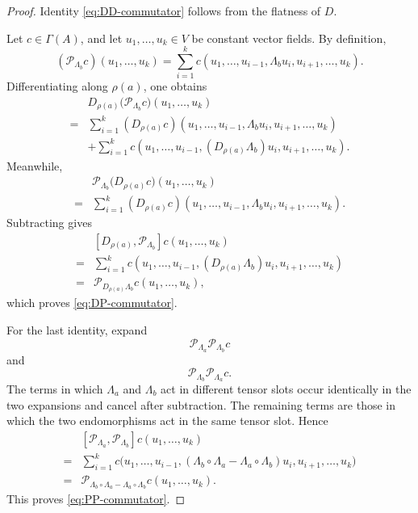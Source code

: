 \documentclass[12pt,reqno]{amsart}
\theoremstyle{definition}
\theoremstyle{remark}
\begin{document}
\begin{proof}
Identity \eqref{eq:DD-commutator} follows from the flatness of \(D\).

Let \(c\in\Gamma(A)\), and let
\(u_1,\ldots,u_k\in V\) be constant vector fields. By definition,
\[
(\mathcal P_{\Lambda_b}c)(u_1,\ldots,u_k)
=
\sum_{i=1}^k
c(u_1,\ldots,u_{i-1},
\Lambda_bu_i,
u_{i+1},\ldots,u_k).
\]
Differentiating along \(\rho(a)\), one obtains
\[
\begin{aligned}
&D_{\rho(a)}
\bigl(\mathcal P_{\Lambda_b}c\bigr)
(u_1,\ldots,u_k)
\\
={}&
\sum_{i=1}^k
(D_{\rho(a)}c)
(u_1,\ldots,u_{i-1},
\Lambda_bu_i,
u_{i+1},\ldots,u_k)
\\
&+
\sum_{i=1}^k
c(u_1,\ldots,u_{i-1},
(D_{\rho(a)}\Lambda_b)u_i,
u_{i+1},\ldots,u_k).
\end{aligned}
\]
Meanwhile,
\[
\begin{aligned}
&\mathcal P_{\Lambda_b}
\bigl(D_{\rho(a)}c\bigr)
(u_1,\ldots,u_k)
\\
={}&
\sum_{i=1}^k
(D_{\rho(a)}c)
(u_1,\ldots,u_{i-1},
\Lambda_bu_i,
u_{i+1},\ldots,u_k).
\end{aligned}
\]
Subtracting gives
\[
\begin{aligned}
&[D_{\rho(a)},\mathcal P_{\Lambda_b}]c
(u_1,\ldots,u_k)
\\
={}&
\sum_{i=1}^k
c(u_1,\ldots,u_{i-1},
(D_{\rho(a)}\Lambda_b)u_i,
u_{i+1},\ldots,u_k)
\\
={}&
\mathcal P_{D_{\rho(a)}\Lambda_b}c
(u_1,\ldots,u_k),
\end{aligned}
\]
which proves \eqref{eq:DP-commutator}.

For the last identity, expand
\[
\mathcal P_{\Lambda_a}
\mathcal P_{\Lambda_b}c
\]
and
\[
\mathcal P_{\Lambda_b}
\mathcal P_{\Lambda_a}c.
\]
The terms in which \(\Lambda_a\) and \(\Lambda_b\) act in different
tensor slots occur identically in the two expansions and cancel
after subtraction. The remaining terms are those in which the two
endomorphisms act in the same tensor slot. Hence
\[
\begin{aligned}
&[\mathcal P_{\Lambda_a},\mathcal P_{\Lambda_b}]c
(u_1,\ldots,u_k)
\\
={}&
\sum_{i=1}^k
c\bigl(
u_1,\ldots,u_{i-1},
(\Lambda_b\circ\Lambda_a
-
\Lambda_a\circ\Lambda_b)u_i,
u_{i+1},\ldots,u_k
\bigr)
\\
={}&
\mathcal P_{
\Lambda_b\circ\Lambda_a
-
\Lambda_a\circ\Lambda_b
}c(u_1,\ldots,u_k).
\end{aligned}
\]
This proves \eqref{eq:PP-commutator}.
\end{proof}
\end{document}
